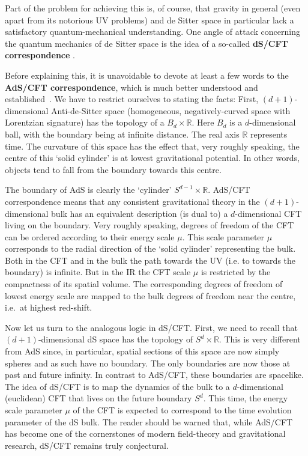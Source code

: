 \documentclass[12pt]{article}
\numberwithin{equation}{section}
\begin{document}
Part of the problem for achieving this is, of course, that gravity in general (even apart from its notorious UV problems) and de Sitter space in particular lack a satisfactory quantum-mechanical understanding. One angle of attack concerning the quantum mechanics of de Sitter space is the idea of a so-called {\bf dS/CFT correspondence} \cite{Strominger:2001pn}. 

Before explaining this, it is unavoidable to devote at least a few words to the {\bf AdS/CFT correspondence}, which is much better understood and established~\cite{Maldacena:1997re, Aharony:1999ti}. We have to restrict ourselves to stating the facts: First, $(d\!+\!1)$-dimensional Anti-de-Sitter space (homogeneous, negatively-curved space with Lorentzian signature) has the topology of a $B_d\times \mathbb{R}$. Here $B_d$ is a $d$-dimensional ball, with the boundary being at infinite distance. The real axis $\mathbb{R}$ represents time. The curvature of this space has the effect that, very roughly speaking, the centre of this `solid cylinder' is at lowest gravitational potential. In other words, objects tend to fall from the boundary towards this centre.

The boundary of AdS is clearly the `cylinder' $S^{d-1}\times \mathbb{R}$. AdS/CFT correspondence means that any consistent gravitational theory in the $(d\!+\!1)$-dimensional bulk has an equivalent description (is dual to) a $d$-dimensional CFT living on the boundary. Very roughly speaking, degrees of freedom of the CFT can be ordered according to their energy scale $\mu$. This scale parameter $\mu$ corresponds to the radial direction of the `solid cylinder' representing the bulk. Both in the CFT and in the bulk the path towards the UV (i.e. to towards the boundary) is infinite. But in the IR the CFT scale $\mu$ is restricted by the compactness of its spatial volume. The corresponding degrees of freedom of lowest energy scale are mapped to the bulk degrees of freedom near the centre, i.e.~at highest red-shift.

Now let us turn to the analogous logic in dS/CFT. First, we need to recall that $(d\!+\!1)$-dimensional dS space has the topology of $S^d\times \mathbb{R}$. This is very different from AdS since, in particular, spatial sections of this space are now simply spheres and as such have no boundary. The only boundaries are now those at past and future infinity. In contrast to AdS/CFT, these boundaries are spacelike. The idea of dS/CFT is to map the dynamics of the bulk to a $d$-dimensional (euclidean) CFT that lives on the future boundary $S^d$. This time, the energy scale parameter $\mu$ of the CFT is expected to correspond to the time evolution parameter of the dS bulk. The reader should be warned that, while AdS/CFT has become one of the cornerstones of modern field-theory and gravitational research, dS/CFT remains truly conjectural.
\end{document}
